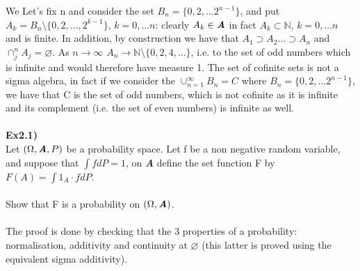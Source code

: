 \documentclass[12pt,mythesisstyle]{report}
\begin{document}
We Let's fix n and consider the set \(B_n=\{0,2,...2^{n-1}\}\), and put \(A_k=B_n\setminus\{0,2,...,2^{k-1}\}\), \(k=0,...n\): clearly \(A_k\in\textbf{\textit{A}}\) in fact \(A_k\subset\mathbb{N}\), \(k=0,...n\) and is finite. In addition, by construction we have that \(A_1\supset A_2...\supset A_n\) and $\cap_{j}^n A_j=\varnothing$. As \(n\rightarrow\infty\) $A_n\rightarrow\mathbb{N}\setminus\{0,2,4,...\}$, i.e. to the set of odd numbers which is infinite and would therefore have measure 1. The set of cofinite sets is not a sigma algebra, in fact if we consider the \(\cup_{n=1}^\infty B_n=C\) where $B_n=\{0,2,...2^{n-1}\}$, we have that C is the set of odd numbers, which is not cofinite as it is infinite and its complement (i.e. the set of even numbers) is infinite as well.
\\\\
\textbf{Ex2.1)}\\
Let $(\Omega, \textbf{\textit{A}}, P)$ be a probability space. Let f be a non negative random variable, and suppose that $\int fdP=1$, on \textbf{\textit{A}} define the set function F by $F(A)=\int1_A\cdot fdP$.
\\\\
Show that F is a probability on $(\Omega, \textbf{\textit{A}})$.
\\
\\The proof is done by checking that the 3 properties of a probability: normalisation, additivity and continuity at $\varnothing$ (this latter is proved using the equivalent sigma additivity).
\\
\end{document}
